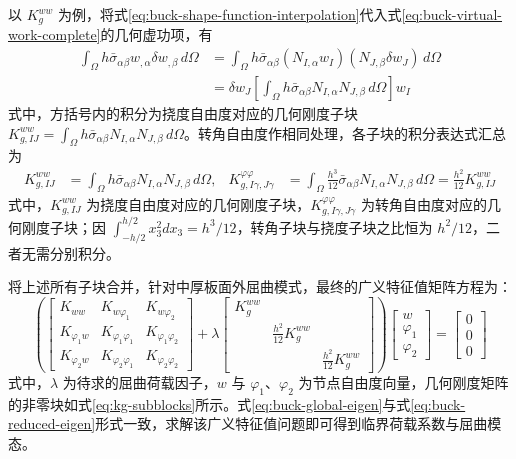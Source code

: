 以 $K_g^{ww}$ 为例，将式\eqref{eq:buck-shape-function-interpolation}代入式\eqref{eq:buck-virtual-work-complete}的几何虚功项，有
\begin{equation}
\begin{aligned}
\int_\Omega h\bar{\sigma}_{\alpha\beta} w_{,\alpha}\delta w_{,\beta}\, d\Omega
&= \int_\Omega h\bar{\sigma}_{\alpha\beta}(N_{I,\alpha}w_I)(N_{J,\beta}\delta w_J)\, d\Omega \\
&= \delta w_J \left[\int_\Omega h\bar{\sigma}_{\alpha\beta}N_{I,\alpha}N_{J,\beta}\, d\Omega\right] w_I
\end{aligned}
\label{eq:kgww-chain}
\end{equation}
式中，方括号内的积分为挠度自由度对应的几何刚度子块 $K_{g,IJ}^{ww} = \int_\Omega h\bar{\sigma}_{\alpha\beta}N_{I,\alpha}N_{J,\beta}\, d\Omega$。转角自由度作相同处理，各子块的积分表达式汇总为
\begin{equation}
\begin{aligned}
K_{g,IJ}^{ww} &= \int_\Omega h\bar{\sigma}_{\alpha\beta}N_{I,\alpha}N_{J,\beta}\, d\Omega, &
K_{g,I\gamma,J\gamma}^{\varphi\varphi} &= \int_\Omega \frac{h^3}{12}\bar{\sigma}_{\alpha\beta}N_{I,\alpha}N_{J,\beta}\, d\Omega = \frac{h^2}{12}K_{g,IJ}^{ww}
\end{aligned}
\label{eq:kg-subblocks}
\end{equation}
式中，$K_{g,IJ}^{ww}$ 为挠度自由度对应的几何刚度子块，$K_{g,I\gamma,J\gamma}^{\varphi\varphi}$ 为转角自由度对应的几何刚度子块；因 $\int_{-h/2}^{h/2}x_3^2 dx_3 = h^3/12$，转角子块与挠度子块之比恒为 $h^2/12$，二者无需分别积分。

将上述所有子块合并，针对中厚板面外屈曲模式，最终的广义特征值矩阵方程为：
\begin{equation}
\left(
\begin{bmatrix}
K_{ww} & K_{w\varphi_1} & K_{w\varphi_2} \\
K_{\varphi_1 w} & K_{\varphi_1\varphi_1} & K_{\varphi_1\varphi_2} \\
K_{\varphi_2 w} & K_{\varphi_2\varphi_1} & K_{\varphi_2\varphi_2}
\end{bmatrix}
+ \lambda
\begin{bmatrix}
K_g^{ww} & & \\
& \frac{h^2}{12}K_g^{ww} & \\
& & \frac{h^2}{12}K_g^{ww}
\end{bmatrix}
\right)
\begin{bmatrix} w \\ \varphi_1 \\ \varphi_2 \end{bmatrix}
= \begin{bmatrix} 0 \\ 0 \\ 0 \end{bmatrix}
\label{eq:buck-global-eigen}
\end{equation}
式中，$\lambda$ 为待求的屈曲荷载因子，$w$ 与 $\varphi_1$、$\varphi_2$ 为节点自由度向量，几何刚度矩阵的非零块如式\eqref{eq:kg-subblocks}所示。式\eqref{eq:buck-global-eigen}与式\eqref{eq:buck-reduced-eigen}形式一致，求解该广义特征值问题即可得到临界荷载系数与屈曲模态。

